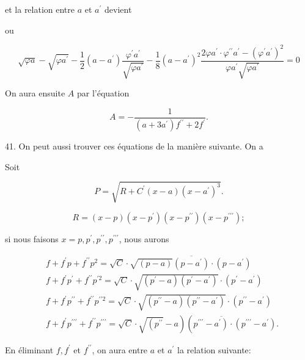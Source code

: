 \documentclass{article}
\begin{document}
et la relation entre \(a\) et \(a^{\prime}\) devient

ou

\[
\sqrt{\varphi a}-\sqrt{\varphi a^{\prime}}-\frac{1}{2}\left(a-a^{\prime}\right) \frac{\varphi^{\prime} a^{\prime}}{\sqrt{\varphi a^{\prime}}}-\frac{1}{8}\left(a-a^{\prime}\right)^{2} \frac{2 \varphi a^{\prime} \cdot \varphi^{\prime \prime} a^{\prime}-\left(\varphi^{\prime} a^{\prime}\right)^{2}}{\varphi a^{\prime} \sqrt{\varphi a^{\prime}}}=0
\]


On aura ensuite \(A\) par l'équation

\[
A=-\frac{1}{\left(a+3 a^{\prime}\right) f^{\prime \prime}+2 f^{\prime}} .
\]

41. On peut aussi trouver ces équations de la manière suivante. On a

Soit

\[
P=\sqrt{R+C^{\prime}(x-a)\left(x-a^{\prime}\right)^{3}} .
\]

\[
R=(x-p)\left(x-p^{\prime}\right)\left(x-p^{\prime \prime}\right)\left(x-p^{\prime \prime \prime}\right) ;
\]

si nous faisons \(x=p, p^{\prime}, p^{\prime \prime}, p^{\prime \prime \prime}\), nous aurons

\[
\begin{aligned}
& f+f^{\prime} p+f^{\prime \prime} p^{2}=\sqrt{C} \cdot \sqrt{(p-a)} \overline{\left(p-a^{\prime}\right)} \cdot\left(p-a^{\prime}\right) \\
& f+f^{\prime} p^{\prime}+f^{\prime \prime} p^{\prime 2}=\sqrt{C} \cdot \sqrt{\left(p^{\prime}-a\right)\left(p^{\prime}-a^{\prime}\right)} \cdot\left(p^{\prime}-a^{\prime}\right) \\
& f+f^{\prime} p^{\prime \prime}+f^{\prime \prime} p^{\prime \prime 2}=\sqrt{C} \cdot \sqrt{\left(p^{\prime \prime}-a\right)\left(p^{\prime \prime}-a^{\prime}\right)} \cdot\left(p^{\prime \prime}-a^{\prime}\right) \\
& \left.f+f^{\prime} p^{\prime \prime \prime}+f^{\prime \prime} p^{\prime \prime \prime}=\sqrt{C} \cdot \sqrt{\left(p^{\prime \prime}\right.}-a\right)\left(p^{\prime \prime \prime}-\overline{\left.a^{\prime}\right)} \cdot\left(p^{\prime \prime \prime}-a^{\prime}\right) .\right.
\end{aligned}
\]

En éliminant \(f, f^{\prime}\) et \(f^{\prime \prime}\), on aura entre \(a\) et \(a^{\prime}\) la relation suivante:
\end{document}
